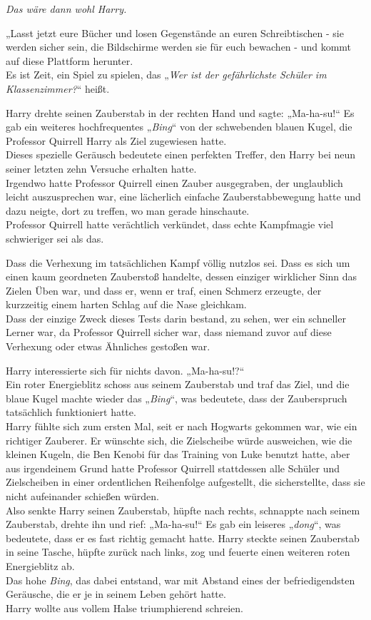 {\emph{Das wäre dann wohl Harry.}

„Lasst jetzt eure Bücher und losen Gegenstände an euren Schreibtischen - sie werden sicher sein, die Bildschirme werden sie für euch bewachen - und kommt auf diese Plattform herunter.\\ Es ist Zeit, ein Spiel zu spielen, das „\emph{Wer ist der gefährlichste Schüler im Klassenzimmer?}“ heißt.

Harry drehte seinen Zauberstab in der rechten Hand und sagte: „Ma-ha-su!“ Es gab ein weiteres hochfrequentes „\emph{Bing}“ von der schwebenden blauen Kugel, die Professor Quirrell Harry als Ziel zugewiesen hatte.\\ Dieses spezielle Geräusch bedeutete einen perfekten Treffer, den Harry bei neun seiner letzten zehn Versuche erhalten hatte.\\ Irgendwo hatte Professor Quirrell einen Zauber ausgegraben, der unglaublich leicht auszusprechen war, eine lächerlich einfache Zauberstabbewegung hatte und dazu neigte, dort zu treffen, wo man gerade hinschaute.\\ Professor Quirrell hatte verächtlich verkündet, dass echte Kampfmagie viel schwieriger sei als das.

Dass die Verhexung im tatsächlichen Kampf völlig nutzlos sei. Dass es sich um einen kaum geordneten Zauberstoß handelte, dessen einziger wirklicher Sinn das Zielen Üben war, und dass er, wenn er traf, einen Schmerz erzeugte, der kurzzeitig einem harten Schlag auf die Nase gleichkam.\\ Dass der einzige Zweck dieses Tests darin bestand, zu sehen, wer ein schneller Lerner war, da Professor Quirrell sicher war, dass niemand zuvor auf diese Verhexung oder etwas Ähnliches gestoßen war.

Harry interessierte sich für nichts davon. „Ma-ha-su!?“\\ Ein roter Energieblitz schoss aus seinem Zauberstab und traf das Ziel, und die blaue Kugel machte wieder das „\emph{Bing}“, was bedeutete, dass der Zauberspruch tatsächlich funktioniert hatte.\\ Harry fühlte sich zum ersten Mal, seit er nach Hogwarts gekommen war, wie ein richtiger Zauberer. Er wünschte sich, die Zielscheibe würde ausweichen, wie die kleinen Kugeln, die Ben Kenobi für das Training von Luke benutzt hatte, aber aus irgendeinem Grund hatte Professor Quirrell stattdessen alle Schüler und Zielscheiben in einer ordentlichen Reihenfolge aufgestellt, die sicherstellte, dass sie nicht aufeinander schießen würden.\\ Also senkte Harry seinen Zauberstab, hüpfte nach rechts, schnappte nach seinem Zauberstab, drehte ihn und rief: „Ma-ha-su!“ Es gab ein leiseres „\emph{dong}“, was bedeutete, dass er es fast richtig gemacht hatte. Harry steckte seinen Zauberstab in seine Tasche, hüpfte zurück nach links, zog und feuerte einen weiteren roten Energieblitz ab.\\ Das hohe \emph{Bing}, das dabei entstand, war mit Abstand eines der befriedigendsten Geräusche, die er je in seinem Leben gehört hatte.\\ Harry wollte aus vollem Halse triumphierend schreien.

}
